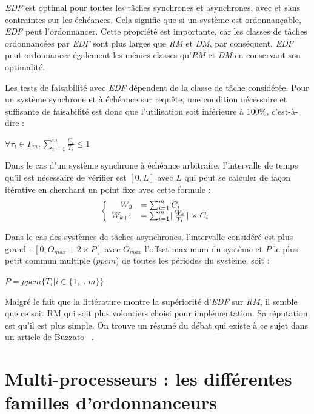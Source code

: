\documentclass[11pt,a4paper,oneside]{report}
\begin{document}
	\textit{EDF} est optimal pour toutes les tâches synchrones et asynchrones, avec et sans 
	contraintes sur les échéances. 
	Cela signifie que si un système est ordonnançable, \textit{EDF} peut l'ordonnancer.\medskip
	Cette propriété est importante, car les classes de tâches ordonnancées par \textit{EDF} 
	sont plus larges que \textit{RM} et \textit{DM}, par conséquent, \textit{EDF} peut ordonnancer également les 
	mêmes classes qu'\textit{RM} et \textit{DM} en conservant son optimalité. \medskip
	
	Les tests de faisabilité avec \textit{EDF} dépendent de la classe de tâche considérée. 
	Pour un système synchrone et à échéance sur requête, 
	une condition nécessaire et suffisante de faisabilité est donc que l'utilisation soit inférieure 
	à 100\%, c'est-à-dire : \medskip
	\begin{center}
		$\forall \tau_i \in \Gamma_m, \sum_{i=1}^{m}\frac{C_i}{T_i} \leq 1 $
	\end{center}
	
	Dans le cas d'un système synchrone à échéance arbitraire, l'intervalle de temps qu'il est 
	nécessaire de vérifier est $[0, L]$ avec $L$ qui peut se calculer de façon itérative en cherchant un point fixe 
	avec cette formule : \medskip
	\[
	\left \{
	\begin{array}{r l}
	W_0 &= \sum_{i = 1}^{m}C_i\\
	W_{k+1} & =\sum_{i = 1}^{m} \lceil \frac{W_k}{T_i} \rceil \times C_i
	\end{array}
	\right.
	\]
	
	Dans le cas des systèmes de tâches asynchrones, l'intervalle considéré est plus grand : 
	$[0, O_{max} + 2 \times P]$ avec $O_{max}$ l'offset maximum du système et 
	$P$ le plus petit commun multiple ($ppcm$) de toutes les périodes du système, soit : \medskip
	\begin{center}
		$P = ppcm\{T_i | i \in \{1, ... m\}\}$
	\end{center}
	
	Malgré le fait que la littérature montre la supériorité d'\textit{EDF} sur \textit{RM}, 
	il semble que ce soit RM qui soit plus volontiers choisi pour implémentation. 
	Sa réputation est qu'il est plus simple. 
	On trouve un résumé du débat qui existe à ce sujet dans un article de Buzzato~
	\cite{buttazzo_rate_2005}.
	
	\section{Multi-processeurs : les différentes familles d'ordonnanceurs}
	
\end{document}

